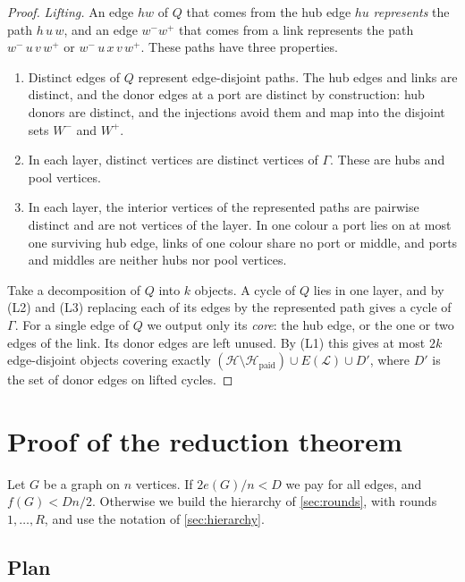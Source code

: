 \documentclass[11pt]{article}
\theoremstyle{definition}
\theoremstyle{remark}
\numberwithin{equation}{section}
\numberwithin{figure}{section}
\numberwithin{table}{section}
\newcommand{\cH}{\mathcal{H}}
\newcommand{\cL}{\mathcal{L}}
\newcommand{\paid}{\mathrm{paid}}
\begin{document}
\begin{proof}
\emph{Lifting.} An edge $hw$ of $Q$ that comes from the hub edge $hu$
\emph{represents} the path $h\,u\,w$, and an edge $w^-w^+$ that comes from a
link represents the path $w^-\,u\,v\,w^+$ or $w^-\,u\,x\,v\,w^+$. These paths
have three properties.
\begin{enumerate}[label=(L\arabic*),itemsep=1pt]
\item Distinct edges of $Q$ represent edge-disjoint paths. The hub edges and
links are distinct, and the donor edges at a port are distinct by construction:
hub donors are distinct, and the injections avoid them and map into the
disjoint sets $W^-$ and $W^+$.
\item In each layer, distinct vertices are distinct vertices of $\Gamma$. These
are hubs and pool vertices.
\item In each layer, the interior vertices of the represented paths are pairwise
distinct and are not vertices of the layer. In one colour a port lies on at
most one surviving hub edge, links of one colour share no port or middle, and
ports and middles are neither hubs nor pool vertices.
\end{enumerate}
Take a decomposition of $Q$ into $k$ objects. A cycle of $Q$ lies in one layer,
and by (L2) and (L3) replacing each of its edges by the represented path gives a
cycle of $\Gamma$. For a single edge of $Q$ we output only its \emph{core}: the
hub edge, or the one or two edges of the link. Its donor edges are left unused.
By (L1) this gives at most $2k$ edge-disjoint objects covering exactly
$(\cH\setminus\cH_\paid)\cup E(\cL)\cup D'$, where $D'$ is the set of donor
edges on lifted cycles.
\end{proof}


\section{Proof of the reduction theorem}\label{sec:proof}

Let $G$ be a graph on $n$ vertices. If $2e(G)/n<D$ we pay for all edges, and
$f(G)<Dn/2$. Otherwise we build the hierarchy of \cref{sec:rounds}, with rounds
$1,\dots,R$, and use the notation of \cref{sec:hierarchy}.

\subsection{Plan}\label{sec:plan}
\end{document}

